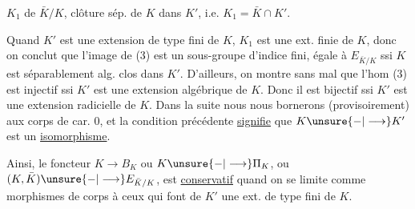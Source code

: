 $K_1$ de $\bar K/K$, clôture  sép. de $K$ dans $K'$, i.e. $K_1=\bar K\cap K'$.

Quand $K'$ est une extension de type fini de $K$, $K_1$ est une ext. finie de $K$, donc on conclut que l'image de (3) est  un sous-groupe d'indice fini, égale à $E_{\bar K/K}$ ssi  $K$ est séparablement alg. clos dans $K'$. D'ailleurs, on montre sans mal que  l'hom (3) est injectif ssi $K'$ est une extension algébrique de $K$. Donc il est bijectif ssi $K'$ est une extension radicielle de $K$. Dans la suite nous nous bornerons (provisoirement) aux corps de car. $0$, et la condition précédente \uline{signifie}  que $K\unsure{-|\longrightarrow}K'$ est un \uline{isomorphisme}.

Ainsi, le foncteur $K\longrightarrow B_K$ ou $K\unsure{-|\longrightarrow}\Pi_K$, ou $(K,\bar K)\unsure{-|\longrightarrow}E_{\bar K/K}$, est \uline{conservatif} quand on se limite comme morphismes de corps  à ceux  qui font de $K'$ une ext. de type fini de $K$.
